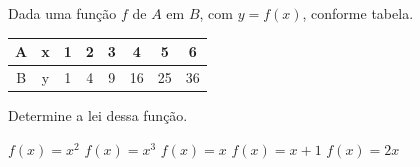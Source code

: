 Dada uma função $f$ de $A$ em $B$, com $y=f(x)$, conforme tabela.

\begin{tabular}{|c|c|c|c|c|c|c|c|}\hline
A & x & 1 & 2 & 3 & 4 & 5 & 6 \\\hline
B & y & 1 & 4 & 9 & 16 & 25 & 36 \\\hline
\end{tabular}

Determine a lei dessa função.

$f(x)=x^2$
$f(x)=x^3$
$f(x)=x$
$f(x)=x+1$
$f(x)=2x$



